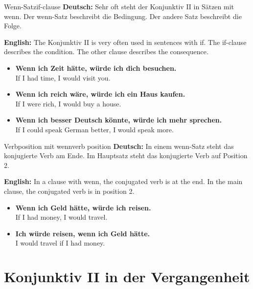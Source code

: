 \documentclass[a4paper,11pt]{article}
\newcommand{\GermanText}[1]{\textbf{Deutsch: }#1\par}
\newcommand{\EnglishText}[1]{{\small\color{SoftGray}\textbf{English: }#1\par}}
\newcommand{\ExampleItem}[2]{\item \textbf{#1}\\{\small\color{SoftGray}#2}}
\begin{document}
    \begin{grammarentry}{Wenn-Satz}{if-clause}
        \GermanText{Sehr oft steht der Konjunktiv II in Sätzen mit wenn. Der wenn-Satz beschreibt die Bedingung. Der andere Satz beschreibt die Folge.}
        \EnglishText{The Konjunktiv II is very often used in sentences with if. The if-clause describes the condition. The other clause describes the consequence.}
        
        \begin{exbox}
            \begin{itemize}
                \ExampleItem{Wenn ich Zeit hätte, würde ich dich besuchen.}{If I had time, I would visit you.}
                \ExampleItem{Wenn ich reich wäre, würde ich ein Haus kaufen.}{If I were rich, I would buy a house.}
                \ExampleItem{Wenn ich besser Deutsch könnte, würde ich mehr sprechen.}{If I could speak German better, I would speak more.}
            \end{itemize}
        \end{exbox}
    \end{grammarentry}
    
    \begin{grammarentry}{Verbposition mit wenn}{verb position}
        \GermanText{In einem wenn-Satz steht das konjugierte Verb am Ende. Im Hauptsatz steht das konjugierte Verb auf Position 2.}
        \EnglishText{In a clause with wenn, the conjugated verb is at the end. In the main clause, the conjugated verb is in position 2.}
        
        \begin{exbox}
            \begin{itemize}
                \ExampleItem{Wenn ich Geld hätte, würde ich reisen.}{If I had money, I would travel.}
                \ExampleItem{Ich würde reisen, wenn ich Geld hätte.}{I would travel if I had money.}
            \end{itemize}
        \end{exbox}
    \end{grammarentry}
    
    \section{Konjunktiv II in der Vergangenheit}
    
\end{document}

